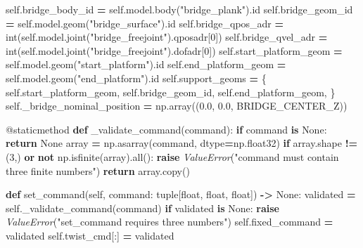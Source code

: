 \documentclass[
  chinese,
  11pt,
  letterpaper,
]{article}
\newenvironment{Shaded}{\begin{snugshade}}{\end{snugshade}}
\newcommand{\AttributeTok}[1]{\textcolor[rgb]{0.13,0.29,0.53}{#1}}
\newcommand{\BuiltInTok}[1]{#1}
\newcommand{\ControlFlowTok}[1]{\textcolor[rgb]{0.13,0.29,0.53}{\textbf{#1}}}
\newcommand{\DecValTok}[1]{\textcolor[rgb]{0.00,0.00,0.81}{#1}}
\newcommand{\FloatTok}[1]{\textcolor[rgb]{0.00,0.00,0.81}{#1}}
\newcommand{\KeywordTok}[1]{\textcolor[rgb]{0.13,0.29,0.53}{\textbf{#1}}}
\newcommand{\NormalTok}[1]{#1}
\newcommand{\OperatorTok}[1]{\textcolor[rgb]{0.81,0.36,0.00}{\textbf{#1}}}
\newcommand{\PreprocessorTok}[1]{\textcolor[rgb]{0.56,0.35,0.01}{\textit{#1}}}
\newcommand{\StringTok}[1]{\textcolor[rgb]{0.31,0.60,0.02}{#1}}
\newcommand{\VariableTok}[1]{\textcolor[rgb]{0.00,0.00,0.00}{#1}}
\renewenvironment{Shaded}{\par\smallskip}{\par\smallskip}
\begin{document}
\begin{Shaded}
\begin{Highlighting}[]
        \VariableTok{self}\NormalTok{.bridge\_body\_id }\OperatorTok{=} \VariableTok{self}\NormalTok{.model.body(}\StringTok{"bridge\_plank"}\NormalTok{).}\BuiltInTok{id}
        \VariableTok{self}\NormalTok{.bridge\_geom\_id }\OperatorTok{=} \VariableTok{self}\NormalTok{.model.geom(}\StringTok{"bridge\_surface"}\NormalTok{).}\BuiltInTok{id}
        \VariableTok{self}\NormalTok{.bridge\_qpos\_adr }\OperatorTok{=} \BuiltInTok{int}\NormalTok{(}\VariableTok{self}\NormalTok{.model.joint(}\StringTok{"bridge\_freejoint"}\NormalTok{).qposadr[}\DecValTok{0}\NormalTok{])}
        \VariableTok{self}\NormalTok{.bridge\_qvel\_adr }\OperatorTok{=} \BuiltInTok{int}\NormalTok{(}\VariableTok{self}\NormalTok{.model.joint(}\StringTok{"bridge\_freejoint"}\NormalTok{).dofadr[}\DecValTok{0}\NormalTok{])}
        \VariableTok{self}\NormalTok{.start\_platform\_geom }\OperatorTok{=} \VariableTok{self}\NormalTok{.model.geom(}\StringTok{"start\_platform"}\NormalTok{).}\BuiltInTok{id}
        \VariableTok{self}\NormalTok{.end\_platform\_geom }\OperatorTok{=} \VariableTok{self}\NormalTok{.model.geom(}\StringTok{"end\_platform"}\NormalTok{).}\BuiltInTok{id}
        \VariableTok{self}\NormalTok{.support\_geoms }\OperatorTok{=}\NormalTok{ \{}
            \VariableTok{self}\NormalTok{.start\_platform\_geom,}
            \VariableTok{self}\NormalTok{.bridge\_geom\_id,}
            \VariableTok{self}\NormalTok{.end\_platform\_geom,}
\NormalTok{        \}}
        \VariableTok{self}\NormalTok{.\_bridge\_nominal\_position }\OperatorTok{=}\NormalTok{ np.array((}\FloatTok{0.0}\NormalTok{, }\FloatTok{0.0}\NormalTok{, BRIDGE\_CENTER\_Z))}

    \AttributeTok{@staticmethod}
    \KeywordTok{def}\NormalTok{ \_validate\_command(command):}
        \ControlFlowTok{if}\NormalTok{ command }\KeywordTok{is} \VariableTok{None}\NormalTok{:}
            \ControlFlowTok{return} \VariableTok{None}
\NormalTok{        array }\OperatorTok{=}\NormalTok{ np.asarray(command, dtype}\OperatorTok{=}\NormalTok{np.float32)}
        \ControlFlowTok{if}\NormalTok{ array.shape }\OperatorTok{!=}\NormalTok{ (}\DecValTok{3}\NormalTok{,) }\KeywordTok{or} \KeywordTok{not}\NormalTok{ np.isfinite(array).}\BuiltInTok{all}\NormalTok{():}
            \ControlFlowTok{raise} \PreprocessorTok{ValueError}\NormalTok{(}\StringTok{"command must contain three finite numbers"}\NormalTok{)}
        \ControlFlowTok{return}\NormalTok{ array.copy()}

    \KeywordTok{def}\NormalTok{ set\_command(}\VariableTok{self}\NormalTok{, command: }\BuiltInTok{tuple}\NormalTok{[}\BuiltInTok{float}\NormalTok{, }\BuiltInTok{float}\NormalTok{, }\BuiltInTok{float}\NormalTok{]) }\OperatorTok{{-}\textgreater{}} \VariableTok{None}\NormalTok{:}
\NormalTok{        validated }\OperatorTok{=} \VariableTok{self}\NormalTok{.\_validate\_command(command)}
        \ControlFlowTok{if}\NormalTok{ validated }\KeywordTok{is} \VariableTok{None}\NormalTok{:}
            \ControlFlowTok{raise} \PreprocessorTok{ValueError}\NormalTok{(}\StringTok{"set\_command requires three numbers"}\NormalTok{)}
        \VariableTok{self}\NormalTok{.fixed\_command }\OperatorTok{=}\NormalTok{ validated}
        \VariableTok{self}\NormalTok{.twist\_cmd[:] }\OperatorTok{=}\NormalTok{ validated}


\end{Highlighting}
\end{Shaded}
\end{document}
